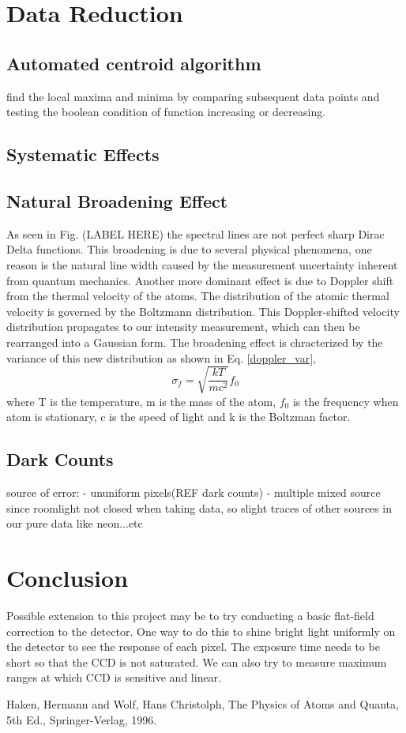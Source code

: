 \documentclass[authoryear, 12pt,5p, times]{elsarticle}
\begin{document}
\section{Data Reduction}
	\subsection{Automated centroid algorithm}
	find the local maxima and minima by comparing subsequent data points and testing the boolean condition of function increasing or decreasing.
	\subsection{Systematic Effects}
	 \subsection{Natural Broadening Effect}
 As seen in Fig. (LABEL HERE) the spectral lines are not perfect sharp Dirac Delta functions. This broadening is due to several physical phenomena, one reason is the natural line width caused by the measurement uncertainty inherent from quantum mechanics. Another more dominant effect is due to Doppler shift from the thermal velocity of the atoms. The distribution of the atomic thermal velocity is governed by the Boltzmann distribution. This Doppler-shifted velocity distribution propagates to our intensity measurement, which can then be rearranged into a Gaussian form. The broadening effect is chracterized by the variance of this new distribution as shown in  Eq. \ref{doppler_var},
 \begin{equation}\label{doppler_var}
\sigma_f = \sqrt{\frac{kT}{mc^2}}f_0
 \end{equation}
 where T is the temperature, m is the mass of the atom, $f_0$ is the frequency when atom is stationary, c is the speed of light and k is the Boltzman factor.
 
 \subsection{Dark Counts}
 
source of error: 
- ununiform pixels(REF dark counts)
- multiple mixed source since roomlight not closed when taking data, so slight traces of other sources in our pure data like neon...etc
 
\section{Conclusion}

Possible extension to this project may be to try conducting a basic flat-field correction to the detector. One way to do this to shine bright light uniformly on the detector to see the response of each pixel.  The exposure time needs to be short so that the CCD is not saturated. We can also try to measure maximum ranges at which CCD is sensitive and linear.

%
%
%

Haken, Hermann and Wolf, Hans Christolph, The Physics of Atoms and Quanta, 5th Ed., Springer-Verlag, 1996.
\end{document}
